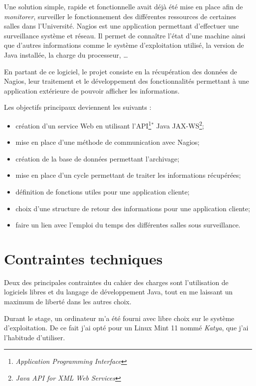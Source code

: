 Une solution simple, rapide et fonctionnelle avait d\'ej\`a \'et\'e mise en place afin de \og{}\textit{monitorer}\fg{}, \cad{} surveiller le fonctionnement des diff\'erentes ressources de certaines salles dans l'Universit\'e.
Nagios est une application permettant d'effectuer une surveillance syst\`eme et r\'eseau.
Il permet de conna\^itre l'\'etat d'une machine ainsi que d'autres informations comme le syst\`eme d'exploitation utilis\'e, la version de Java install\'ee, la charge du processeur, \ldots

En partant de ce logiciel, le projet consiste en la r\'ecup\'eration des donn\'ees de Nagios, leur traitement et le d\'eveloppement des fonctionnalit\'es permettant \`a une application ext\'erieure de pouvoir afficher les informations.

\noindent Les objectifs principaux deviennent les suivants :

\begin{itemize}
	\item cr\'eation d'un service Web en utilisant l'API\protect\footnote{\textit{Application Programming Interface}}$^*$ Java JAX-WS\protect\footnote{\textit{Java API for XML Web Services}};
	\item mise en place d'une m\'ethode de communication avec Nagios;
	\item cr\'eation de la base de donn\'ees permettant l'archivage;
	\item mise en place d'un cycle permettant de traiter les informations r\'ecup\'er\'ees;
	\item d\'efinition de fonctions utiles pour une application cliente;
	\item choix d'une structure de retour des informations pour une application cliente;
	\item faire un lien avec l'emploi du temps des diff\'erentes salles sous surveillance.

\end{itemize}

\section{Contraintes techniques}

Deux des principales contraintes du cahier des charges sont l'utilisation de logiciels libres et du langage de d\'eveloppement Java, tout en me laissant un maximum de libert\'e dans les autres choix.

Durant le stage, un ordinateur m'a \'et\'e fourni avec libre choix sur le syst\`eme d'exploitation.
De ce fait j'ai opt\'e pour un Linux Mint 11 nomm\'e \textit{Katya}, que j'ai l'habitude d'utiliser.

